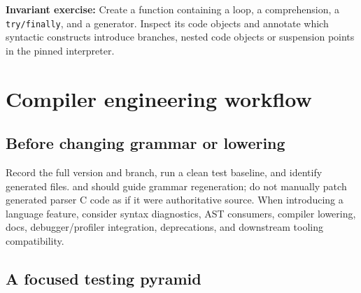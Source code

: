 \documentclass[
  11pt,
]{report}
\newcommand{\passthrough}[1]{#1}
\begin{document}
\textbf{Invariant exercise:} Create a function containing a loop, a
comprehension, a \passthrough{\lstinline!try/finally!}, and a generator.
Inspect its code objects and annotate which syntactic constructs
introduce branches, nested code objects or suspension points in the
pinned interpreter.

\chapter{Compiler engineering
workflow}\label{compiler-engineering-workflow}

\section{Before changing grammar or
lowering}\label{before-changing-grammar-or-lowering}

Record the full version and branch, run a clean test baseline, and
identify generated files.
 and
 should guide grammar
regeneration; do not manually patch generated parser C code as if it
were authoritative source. When introducing a language feature, consider
syntax diagnostics, AST consumers, compiler lowering, docs,
debugger/profiler integration, deprecations, and downstream tooling
compatibility.

\section{A focused testing pyramid}\label{a-focused-testing-pyramid}
\end{document}
